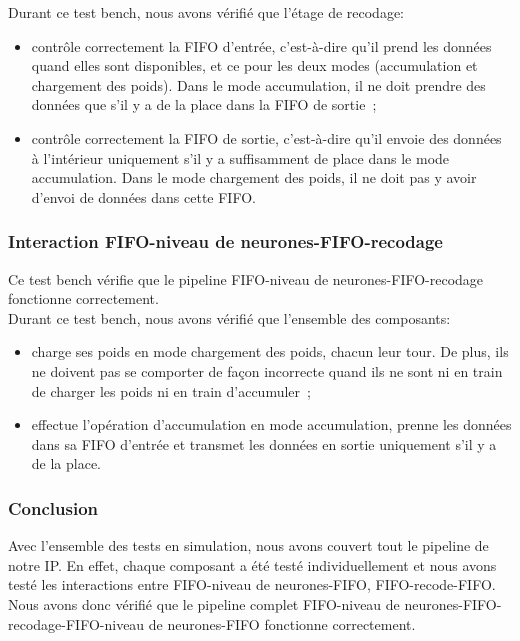 Durant ce test bench, nous avons vérifié que l'étage de recodage:
\begin{itemize}
	\item contrôle correctement la FIFO d'entrée, c'est-à-dire qu'il prend
	les données quand elles sont disponibles, et ce pour les deux modes
	(accumulation et chargement des poids). Dans le mode accumulation, il
	ne doit prendre des données que s'il y a de la place dans la FIFO de
	sortie~;
	\item contrôle correctement la FIFO de sortie, c'est-à-dire qu'il envoie
	des données à l'intérieur uniquement s'il y a suffisamment de place dans
	le mode accumulation. Dans le mode chargement des poids, il ne doit pas
	y avoir d'envoi de données dans cette FIFO.
\end{itemize}

\subsubsection{Interaction FIFO-niveau de neurones-FIFO-recodage}

Ce test bench vérifie que le pipeline FIFO-niveau de neurones-FIFO-recodage
fonctionne correctement.\\

Durant ce test bench, nous avons vérifié que l'ensemble des composants:
\begin{itemize}
	\item charge ses poids en mode chargement des poids, chacun leur tour.
	De plus, ils ne doivent pas se comporter de façon incorrecte quand
	ils ne sont ni en train de charger les poids ni en train d'accumuler~;
	\item effectue l'opération d'accumulation en mode accumulation, prenne
	les données dans sa FIFO d'entrée et transmet les données en sortie
	uniquement s'il y a de la place.
\end{itemize}

\subsubsection{Conclusion}

Avec l'ensemble des tests en simulation, nous avons couvert tout le pipeline de
notre IP. En effet, chaque composant a été testé individuellement et nous avons
testé les interactions entre FIFO-niveau de neurones-FIFO, FIFO-recode-FIFO.
Nous avons donc vérifié que le pipeline complet
FIFO-niveau de neurones-FIFO-recodage-FIFO-niveau de neurones-FIFO fonctionne
correctement.

